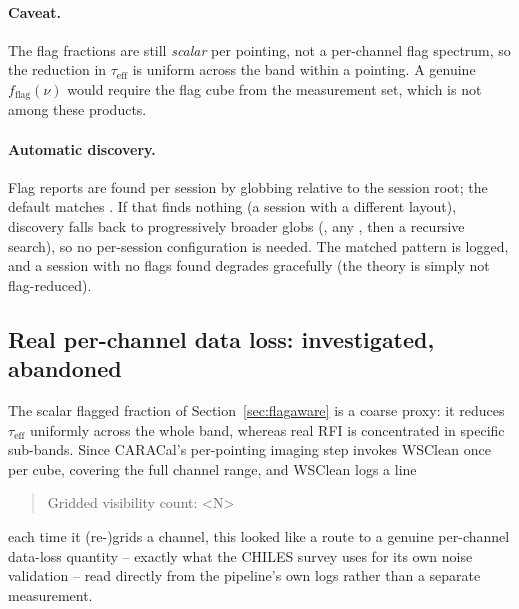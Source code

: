 \documentclass[11pt,a4paper]{article}
\begin{document}
\paragraph{Caveat.} The flag fractions are still \emph{scalar} per pointing, not
a per-channel flag spectrum, so the reduction in $\tau_{\mathrm{eff}}$ is
uniform across the band within a pointing. A genuine $f_{\mathrm{flag}}(\nu)$
would require the flag cube from the measurement set, which is not among these
products.

\paragraph{Automatic discovery.} Flag reports are found per session by globbing
 relative to the session root; the default matches
. If that finds nothing (a session
with a different layout), discovery falls back to progressively broader globs
(, any , then a
recursive search), so no per-session configuration is needed. The matched
pattern is logged, and a session with no flags found degrades gracefully (the
theory is simply not flag-reduced).

\subsection{Real per-channel data loss: investigated, abandoned}\label{sec:nvislog}
The scalar flagged fraction of Section~\ref{sec:flagaware} is a coarse proxy:
it reduces $\tau_{\mathrm{eff}}$ uniformly across the whole band, whereas real
RFI is concentrated in specific sub-bands. Since CARACal's per-pointing
imaging step invokes WSClean \citep{offringa2014} once per cube, covering the
full channel range, and WSClean logs a line
\begin{quote}\ttfamily Gridded visibility count: \textless N\textgreater\end{quote}
each time it (re-)grids a channel, this looked like a route to a genuine
per-channel data-loss quantity -- exactly what the CHILES survey uses for its
own noise validation \citep{luber2025} -- read directly from the pipeline's own
logs rather than a separate measurement.
\end{document}
